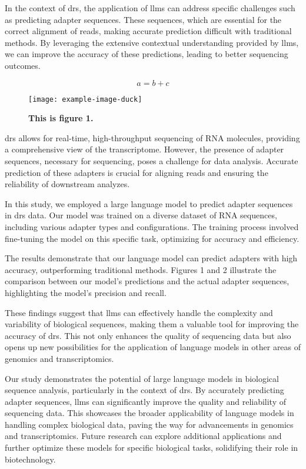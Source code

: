 \documentclass[pdflatex, sn-mathphys-num, lineno]{sn-jnl}%
\theoremstyle{thmstyleone}%
\theoremstyle{thmstyletwo}%
\theoremstyle{thmstylethree}%
\begin{document}
In the context of \gls{drs}, the application of \glspl{llm} can address specific challenges such as predicting adapter sequences.
These sequences, which are essential for the correct alignment of reads, making accurate prediction difficult with traditional methods. By leveraging the extensive contextual understanding provided by \glspl{llm}, we can improve the accuracy of these predictions, leading to better sequencing outcomes.

$$a = b +c$$

\begin{figure}[!h]
	\texttt{[image: example-image-duck]}
	\caption{\bf This is figure 1.}
	\label{fig:f1}
\end{figure}


\gls{drs} allows for real-time, high-throughput sequencing of RNA molecules, providing a comprehensive view of the transcriptome.
However, the presence of adapter sequences, necessary for sequencing, poses a challenge for data analysis.
Accurate prediction of these adapters is crucial for aligning reads and ensuring the reliability of downstream analyzes.

In this study, we employed a large language model to predict adapter sequences in \gls{drs} data.
Our model was trained on a diverse dataset of RNA sequences, including various adapter types and configurations.
The training process involved fine-tuning the model on this specific task, optimizing for accuracy and efficiency.

The results demonstrate that our language model can predict adapters with high accuracy, outperforming traditional methods.
Figures 1 and 2 illustrate the comparison between our model's predictions and the actual adapter sequences, highlighting the model's precision and recall.

These findings suggest that \glspl{llm} can effectively handle the complexity and variability of biological sequences, making them a valuable tool for improving the accuracy of \gls{drs}.
This not only enhances the quality of sequencing data but also opens up new possibilities for the application of language models in other areas of genomics and transcriptomics.

Our study demonstrates the potential of large language models in biological sequence analysis, particularly in the context of \gls{drs}.
By accurately predicting adapter sequences,  \glspl{llm} can significantly improve the quality and reliability of sequencing data.
This showcases the broader applicability of language models in handling complex biological data, paving the way for advancements in genomics and transcriptomics.
Future research can explore additional applications and further optimize these models for specific biological tasks, solidifying their role in biotechnology.
\end{document}
